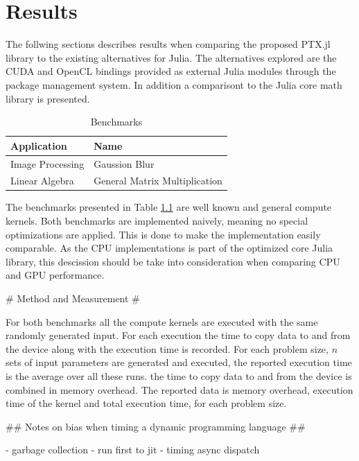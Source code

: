 \chapter{Results}
\label{chap:res}

\begin{markdown}

The follwing sections describes results when comparing the proposed
PTX.jl library to the existing alternatives for Julia. The
alternatives explored are the CUDA and OpenCL bindings provided as
external Julia modules through the package management system. In
addition a comparisont to the Julia core math library is presented.


\begin{table}[H]
  \centering
  \begin{tabular}{|l|l|}
    \hline
    Application & Name \\
    \hline
    Image Processing & Gaussion Blur \\
    \hline
    Linear Algebra & General Matrix Multiplication \\
    \hline
  \end{tabular}
  \caption{Benchmarks}
  \label{res:benchmarks}
\end{table}

The benchmarks presented in Table \ref{res:benchmarks} are well known
and general compute kernels. Both benchmarks are implemented naively,
meaning no special optimizations are applied. This is done to make the
implementation easily comparable. As the CPU implementations is part
of the optimized core Julia library, this descission should be take
into consideration when comparing CPU and GPU performance.

# Method and Measurement #
\label{sec:res:measure}

For both benchmarks all the compute kernels are executed with the same
randomly generated input. For each execution the time to copy data to
and from the device along with the execution time is recorded.  For
each problem size, $n$ sets of input parameters are generated and
executed, the reported execution time is the average over all these
runs. the time to copy data to and from the device is combined in
memory overhead. The reported data is memory overhead, execution time
of the kernel and total execution time, for each problem size.

## Notes on bias when timing a dynamic programming language ##

- garbage collection
- run first to jit
- timing async dispatch


\end{markdown}
